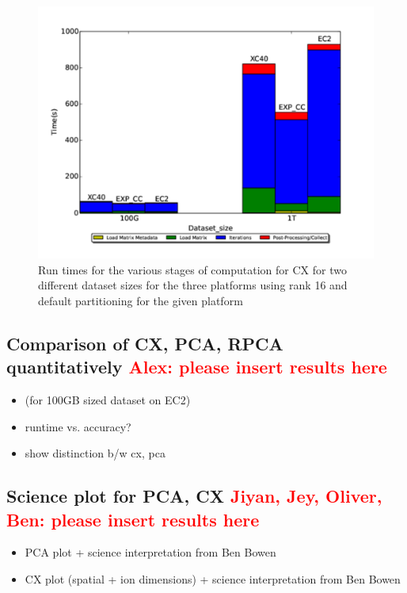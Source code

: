     \begin{figure} [H]
    \begin{centering}
    \includegraphics[scale=0.4]{images/CX_Size_Scaling_Rank_16_Partitions_default.pdf}
    \end{centering}
    \caption{ Run times for the various stages of computation for CX for two different dataset sizes for the three platforms using rank 16 and default partitioning for the given platform} 
    \label{fig:h2hrank16} 
    \end{figure}

    
  

  

  \subsection{Comparison of CX, PCA, RPCA quantitatively \textcolor{red}{Alex: please insert results here} }
    \begin{itemize}
      \item (for 100GB sized dataset on EC2)
      \item runtime vs. accuracy?
      \item show distinction b/w cx, pca
    \end{itemize}

  \subsection{Science plot for PCA, CX \textcolor{red}{Jiyan, Jey, Oliver, Ben: please insert results here}}
    \begin{itemize}
      \item PCA plot + science interpretation from Ben Bowen
      \item CX plot (spatial + ion dimensions) + science interpretation from Ben Bowen
    \end{itemize}
